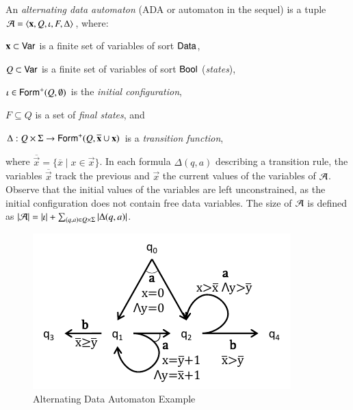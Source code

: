 \documentclass[10pt,conference,letterpaper,twocolumn]{IEEEtran}
\begin{document}
An \emph{alternating data automaton} (ADA or automaton in the sequel)
is a tuple $\mathcal{A} = \left\langle \mathbf x,Q,\iota,F,\Delta \right\rangle$,
where: \begin{compactitem}
%
\item $\mathbf x \subset \mathsf{Var}$ is a finite set of variables of sort
  $\mathsf{Data}$,
%
\item $Q \subset \mathsf{Var}$ is a finite set of variables of sort $\mathsf{Bool}$
  (\emph{states}),
%
\item $\iota \in \mathsf{Form}^+(Q,\emptyset)$ is the \emph{initial
  configuration},
%
\item $F \subseteq Q$ is a set of \emph{final states}, and
%
\item $\Delta : Q \times \Sigma \rightarrow
  \mathsf{Form}^+(Q,\overline{\mathbf x}\cup\mathbf x)$ is a \emph{transition
    function},
\end{compactitem}
where $\overline{\vec{x}}=\{\overline{x} \mid x \in \vec{x}\}$. In
each formula $\Delta(q,a)$ describing a transition rule, the variables
$\overline{\vec{x}}$ track the previous and $\vec{x}$ the current
values of the variables of $\mathcal{A}$. Observe that the initial values of
the variables are left unconstrained, as the initial configuration
does not contain free data variables. The size of $\mathcal{A}$ is defined as
${|{\mathcal{A}}|} = {|{\iota}|} + \sum_{(q,a) \in
  Q\times\Sigma}{|{\Delta(q,a)}|}$.

\begin{figure}[htb]
\vspace*{-\baselineskip}
\centerline{\includegraphics[scale=0.8]{Example.pdf}}
\vspace*{-\baselineskip}
\caption{Alternating Data Automaton Example}
\label{fig:ex}
\end{figure}
\end{document}
